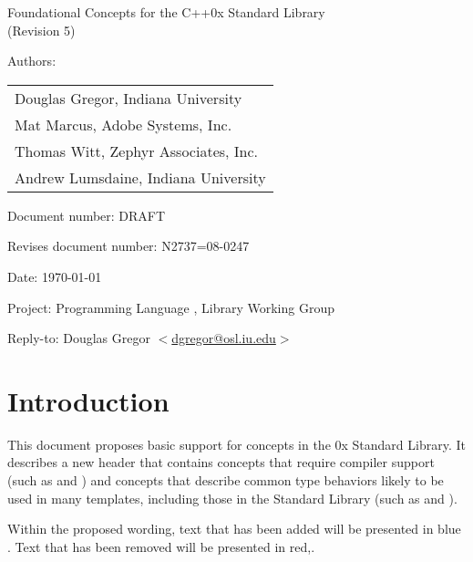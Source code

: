 \documentclass[american,twoside]{book}
\begin{document}
\raggedbottom

\begin{titlepage}
\begin{center}
\huge
Foundational Concepts for the C++0x Standard Library\\
(Revision 5)
\vspace{0.25in}
\end{center}

\normalsize
\vspace{0.25in}
\par\noindent Authors: 
\begin{tabular}[t]{l}
Douglas Gregor, Indiana University \\
Mat Marcus, Adobe Systems, Inc.\\
Thomas Witt, Zephyr Associates, Inc.\\
Andrew Lumsdaine, Indiana University
\end{tabular}\vspace{-6pt}

\par\noindent Document number: DRAFT\vspace{-6pt}
\par\noindent Revises document number: N2737=08-0247\vspace{-6pt}
\par\noindent Date: \today\vspace{-6pt}
\par\noindent Project: Programming Language \Cpp{}, Library Working Group\vspace{-6pt}
\par\noindent Reply-to: Douglas Gregor $<$\href{mailto:dgregor@osl.iu.edu}{dgregor@osl.iu.edu}$>$\vspace{-6pt}

\section*{Introduction}
This document proposes basic support for concepts in the \Cpp0x
Standard Library. It describes a new header  that
contains concepts that require compiler support (such as
 and ) and concepts that describe
common type behaviors likely to be used in many templates, including
those in the Standard Library (such as  and
). 

Within the proposed wording, text that has been added
\textcolor{addclr}{will be presented in blue} . Text that has been removed will be
presented \textcolor{remclr}{in red},.


\end{titlepage}
\end{document}

